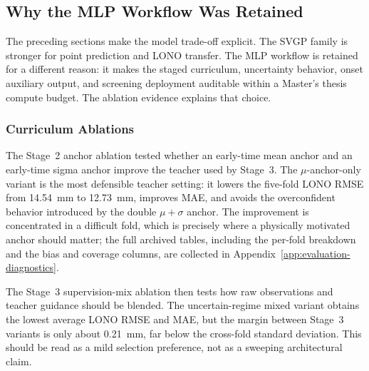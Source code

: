 \FloatBarrier

\subsection{Why the MLP Workflow Was Retained}
\label{sec:why-mlp-retained-rewrite}
\label{sec:mlp-ablation-affordability-en}
\label{sec:mlp-ablation-affordability-zh}

The preceding sections make the model trade-off explicit. The SVGP family is
stronger for point prediction and LONO transfer. The MLP workflow is retained
for a different reason: it makes the staged curriculum, uncertainty behavior,
onset auxiliary output, and screening deployment auditable within a Master's
thesis compute budget. The ablation evidence explains that choice.

\subsubsection{Curriculum Ablations}
\label{sec:curriculum-ablations-rewrite}
\label{sec:stage2-anchor-ablation-en}
\label{sec:stage2-anchor-ablation-zh}

The Stage~2 anchor ablation tested whether an early-time mean anchor and an
early-time sigma anchor improve the teacher used by Stage~3. The
\(\mu\)-anchor-only variant is the most defensible teacher setting: it lowers
the five-fold LONO RMSE from \SI{14.54}{mm} to \SI{12.73}{mm}, improves MAE,
and avoids the overconfident behavior introduced by the double
\(\mu+\sigma\) anchor. The improvement is concentrated in a difficult fold,
which is precisely where a physically motivated anchor should matter; the full
archived tables, including the per-fold breakdown and the bias and coverage
columns, are collected in Appendix~\ref{app:evaluation-diagnostics}.

The Stage~3 supervision-mix ablation then tests how raw observations and
teacher guidance should be blended. The uncertain-regime mixed variant obtains
the lowest average LONO RMSE and MAE, but the margin between Stage~3 variants
is only about \SI{0.21}{mm}, far below the cross-fold standard deviation. This
should be read as a mild selection preference, not as a sweeping architectural
claim.

